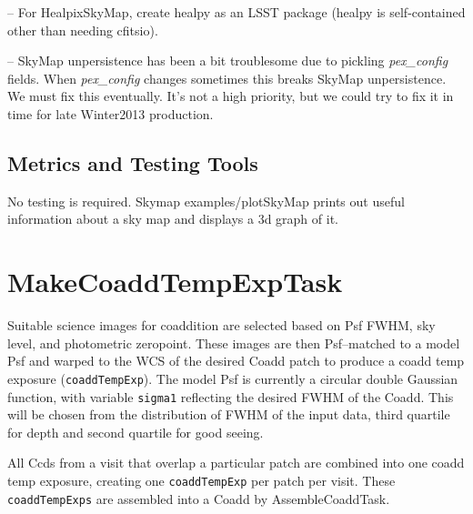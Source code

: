 \documentclass[prd, nofootinbib, floatfix, 11pt,tightenlines,times]{article}
\begin{document}
-- For HealpixSkyMap, create healpy as an LSST package (healpy is
self-contained other than needing cfitsio).

-- SkyMap unpersistence has been a bit troublesome due to pickling {\it pex\_config} fields.
When {\it pex\_config} changes sometimes this breaks SkyMap unpersistence. We must fix this eventually.
It's not a high priority, but we could try to fix it in time
for late Winter2013 production.





\subsection{Metrics and Testing Tools}

No testing is required.  Skymap examples/plotSkyMap prints out useful
information about a sky map and displays a 3d graph of it.


\section{MakeCoaddTempExpTask} 

Suitable science images for coaddition are selected based on Psf FWHM,
sky level, and photometric zeropoint.  These images are then
Psf--matched to a model Psf and warped to the WCS of the desired Coadd
patch to produce a coadd temp exposure ({\tt coaddTempExp}).  The
model Psf is currently a circular double Gaussian function, with
variable {\tt sigma1} reflecting the desired FWHM of the Coadd.  This
will be chosen from the distribution of FWHM of the input data, third
quartile for depth and second quartile for good seeing.

All Ccds from a visit that overlap a particular patch are combined
into one coadd temp exposure, creating one {\tt coaddTempExp} per
patch per visit.  These {\tt coaddTempExps} are assembled into a
Coadd by AssembleCoaddTask.
\end{document}
